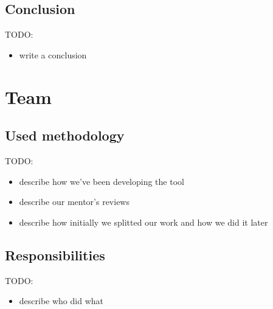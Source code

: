 \documentclass[licencjacka,en]{pracamgr}
\begin{document}
\section{Conclusion}

TODO:
\begin{itemize}
	\item write a conclusion
\end{itemize}

\chapter{Team}\label{r:chapter_team}

\section{Used methodology}

TODO:
\begin{itemize}
	\item describe how we've been developing the tool
	\item describe our mentor's reviews
	\item describe how initially we splitted our work and how we did it later
\end{itemize}

\section{Responsibilities}

TODO:
\begin{itemize}
	\item describe who did what
\end{itemize}


\appendix
\end{document}
